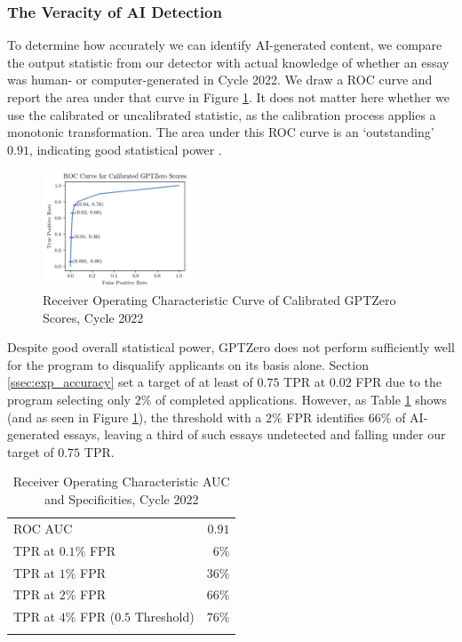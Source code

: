 \subsubsection{The Veracity of AI Detection}
To determine how accurately we can identify AI-generated content, we compare the output statistic from our detector with actual knowledge of whether an essay was human- or computer-generated in Cycle 2022. We draw a ROC curve and report the area under that curve in Figure \ref{fig:c2_roc}. It does not matter here whether we use the calibrated or uncalibrated statistic, as the calibration process applies a monotonic transformation. The area under this ROC curve is an `outstanding' $0.91$, indicating good statistical power \cite{Mandrekar_2010}.

\begin{figure}[tbh]
    \centering
    \includegraphics[width=0.4\textwidth]{figures/generative_ai/ROC.png}
    \caption{Receiver Operating Characteristic Curve of Calibrated GPTZero Scores, Cycle 2022}
    \label{fig:c2_roc}
\end{figure}

Despite good overall statistical power, GPTZero does not perform sufficiently well for the program to disqualify applicants on its basis alone. Section \ref{ssec:exp_accuracy} set a target of at least of $0.75$ TPR at $0.02$ FPR due to the program selecting only $2\%$ of completed applications. However, as Table \ref{tab:c2_tprs} shows (and as seen in Figure \ref{fig:c2_roc}), the threshold with a $2\%$ FPR identifies $66\%$ of AI-generated essays, leaving a third of such essays undetected and falling under our target of $0.75$ TPR.

\begin{table}[tbh]
   \centering
   \caption{Receiver Operating Characteristic AUC and Specificities, Cycle 2022}
   \label{tab:c2_tprs}
   \begin{tabular}{ l r }
       \toprule
       ROC AUC & $0.91$ \\
       TPR at $0.1\%$ FPR & $6\%$ \\
       TPR at $1\%$ FPR & $36\%$ \\
       TPR at $2\%$ FPR & $66\%$ \\
       TPR at $4\%$ FPR ($0.5$ Threshold) & $76\%$ \\
       \bottomrule\\
   \end{tabular}
\end{table}

